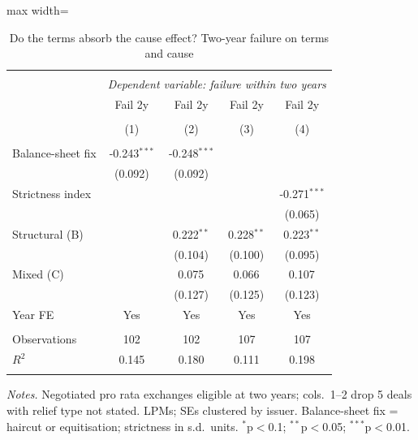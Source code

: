 \begin{table}[!htbp] \centering
  \caption{Do the terms absorb the cause effect? Two-year failure on terms and cause}
\begin{adjustbox}{max width=\textwidth}
\begin{tabular}{@{\extracolsep{5pt}}lcccc}
\\[-1.8ex]\hline
\hline \\[-1.8ex]
& \multicolumn{4}{c}{\textit{Dependent variable: failure within two years}} \
\cr \cline{2-5}
\\[-1.8ex] & \multicolumn{1}{c}{Fail 2y} & \multicolumn{1}{c}{Fail 2y} & \multicolumn{1}{c}{Fail 2y} & \multicolumn{1}{c}{Fail 2y}  \\
\\[-1.8ex] & (1) & (2) & (3) & (4) \\
\hline \\[-1.8ex]
 Balance-sheet fix & -0.243$^{***}$ & -0.248$^{***}$ & & \\
& (0.092) & (0.092) & & \\
 Strictness index & & & & -0.271$^{***}$ \\
& & & & (0.065) \\
 Structural (B) & & 0.222$^{**}$ & 0.228$^{**}$ & 0.223$^{**}$ \\
& & (0.104) & (0.100) & (0.095) \\
 Mixed (C) & & 0.075$^{}$ & 0.066$^{}$ & 0.107$^{}$ \\
& & (0.127) & (0.125) & (0.123) \\
 Year FE & Yes & Yes & Yes & Yes \\
\hline \\[-1.8ex]
 Observations & 102 & 102 & 107 & 107 \\
 $R^2$ & 0.145 & 0.180 & 0.111 & 0.198 \\
\hline
\hline \\[-1.8ex]
\end{tabular}
\end{adjustbox}
\label{tab:absorb}
\begin{minipage}{0.95\textwidth}\vspace{4pt}\footnotesize
\textit{Notes.} Negotiated pro rata exchanges eligible at two years; cols.\ 1--2 drop 5 deals with relief type not stated. LPMs; SEs clustered by issuer. Balance-sheet fix = haircut or equitisation; strictness in s.d.\ units. $^{*}$p$<$0.1; $^{**}$p$<$0.05; $^{***}$p$<$0.01.
\end{minipage}
\end{table}